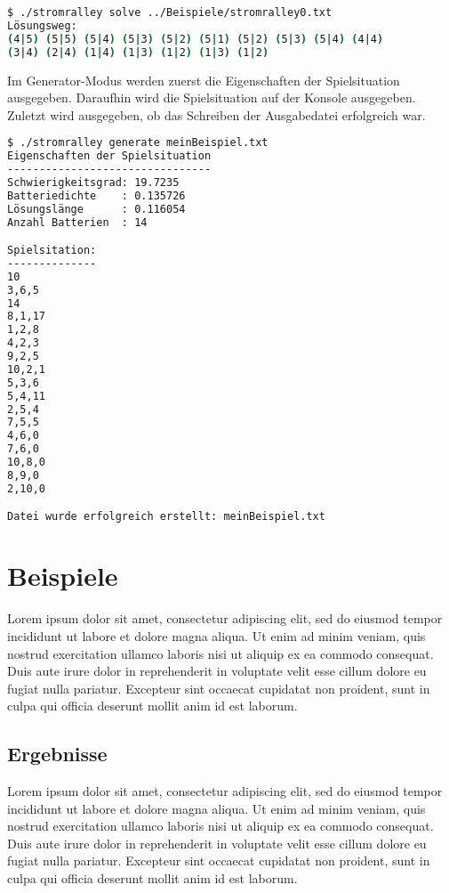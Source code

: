 \documentclass[a4paper,10pt,ngerman]{scrartcl}
\begin{document}
\begin{lstlisting}[language=bash, numbers=none, frame=single]
$ ./stromralley solve ../Beispiele/stromralley0.txt
Lösungsweg:
(4|5) (5|5) (5|4) (5|3) (5|2) (5|1) (5|2) (5|3) (5|4) (4|4)
(3|4) (2|4) (1|4) (1|3) (1|2) (1|3) (1|2)
\end{lstlisting}

Im Generator-Modus werden zuerst die Eigenschaften der Spielsituation ausgegeben.
Daraufhin wird die Spielsituation auf der Konsole ausgegeben.
Zuletzt wird ausgegeben, ob das Schreiben der Ausgabedatei erfolgreich war.

\begin{lstlisting}[language=bash, numbers=none, frame=single]
$ ./stromralley generate meinBeispiel.txt
Eigenschaften der Spielsituation
--------------------------------
Schwierigkeitsgrad: 19.7235
Batteriedichte    : 0.135726
Lösungslänge      : 0.116054
Anzahl Batterien  : 14

Spielsitation:
--------------
10
3,6,5
14
8,1,17
1,2,8
4,2,3
9,2,5
10,2,1
5,3,6
5,4,11
2,5,4
7,5,5
4,6,0
7,6,0
10,8,0
8,9,0
2,10,0

Datei wurde erfolgreich erstellt: meinBeispiel.txt
\end{lstlisting}

\section{Beispiele}
Lorem ipsum dolor sit amet, consectetur adipiscing elit, sed do eiusmod tempor incididunt ut labore et dolore magna aliqua.
Ut enim ad minim veniam, quis nostrud exercitation ullamco laboris nisi ut aliquip ex ea commodo consequat.
Duis aute irure dolor in reprehenderit in voluptate velit esse cillum dolore eu fugiat nulla pariatur.
Excepteur sint occaecat cupidatat non proident, sunt in culpa qui officia deserunt mollit anim id est laborum.

\subsection{Ergebnisse}
Lorem ipsum dolor sit amet, consectetur adipiscing elit, sed do eiusmod tempor incididunt ut labore et dolore magna aliqua.
Ut enim ad minim veniam, quis nostrud exercitation ullamco laboris nisi ut aliquip ex ea commodo consequat.
Duis aute irure dolor in reprehenderit in voluptate velit esse cillum dolore eu fugiat nulla pariatur.
Excepteur sint occaecat cupidatat non proident, sunt in culpa qui officia deserunt mollit anim id est laborum.
\end{document}
